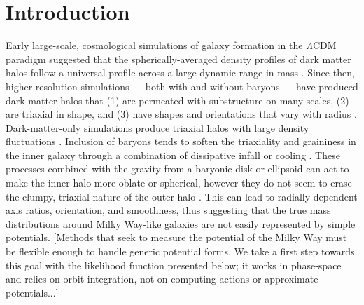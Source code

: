 \documentclass[letterpaper,12pt,preprint]{aastex}
\begin{document}

\section{Introduction}\label{sec:intro}


Early large-scale, cosmological simulations of galaxy formation in the $\Lambda$CDM paradigm suggested that the spherically-averaged density profiles of dark matter halos follow a universal profile across a large dynamic range in mass \citep{navarro96}. Since then, higher resolution simulations --- both with and without baryons --- have produced dark matter halos that (1) are permeated with substructure on many scales, (2) are triaxial in shape, and (3) have shapes and orientations that vary with radius \citep{dubinski91, jing02, kuhlen07, veraciro11}. Dark-matter-only simulations produce triaxial halos \citep{jing02} with large density fluctuations \citep{zemp09}. Inclusion of baryons tends to soften the triaxiality and graininess in the inner galaxy through a combination of dissipative infall \citep{dubinski94} or cooling \citep{bryan13}. These processes combined with the gravity from a baryonic disk or ellipsoid can act to make the inner halo more oblate or spherical, however they do not seem to erase the clumpy, triaxial nature of the outer halo \citep[e.g.,][]{pontzen12}. This can lead to radially-dependent axis ratios, orientation, and smoothness, thus suggesting that the true mass distributions around Milky Way-like galaxies are not easily represented by simple potentials. [Methods that seek to measure the potential of the Milky Way must be flexible enough to handle generic potential forms. We take a first step towards this goal with the likelihood function presented below; it works in phase-space and relies on orbit integration, not on computing actions or approximate potentials...]
\end{document}
